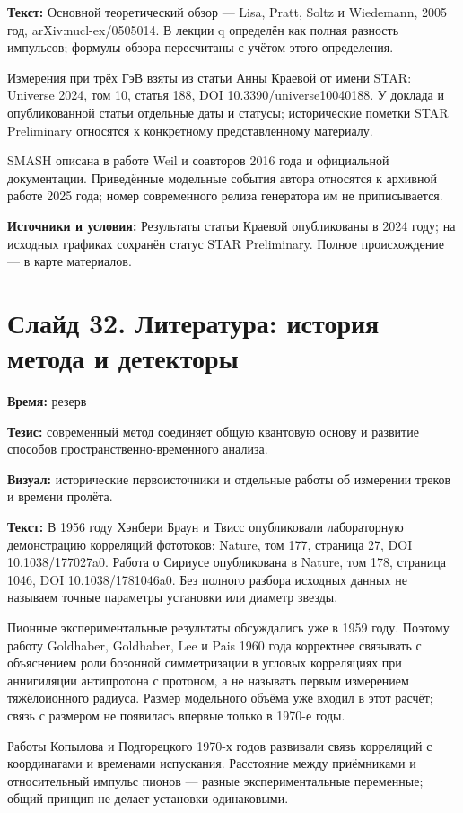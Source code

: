 \documentclass[11pt,a4paper]{article}
\begin{document}
\textbf{Текст:} Основной теоретический обзор — Lisa, Pratt, Soltz и Wiedemann, 2005 год, arXiv:nucl-ex/0505014. В лекции q определён как полная разность импульсов; формулы обзора пересчитаны с учётом этого определения.

Измерения при трёх ГэВ взяты из статьи Анны Краевой от имени STAR: Universe 2024, том 10, статья 188, DOI 10.3390/universe10040188. У доклада и опубликованной статьи отдельные даты и статусы; исторические пометки STAR Preliminary относятся к конкретному представленному материалу.

SMASH описана в работе Weil и соавторов 2016 года и официальной документации. Приведённые модельные события автора относятся к архивной работе 2025 года; номер современного релиза генератора им не приписывается.

\textbf{Источники и условия:} Результаты статьи Краевой опубликованы в 2024 году; на исходных графиках сохранён статус STAR Preliminary. Полное происхождение — в карте материалов.

\clearpage
\section*{Слайд 32. Литература: история метода и детекторы}
\textbf{Время:} резерв

\textbf{Тезис:} современный метод соединяет общую квантовую основу и развитие способов пространственно-временного анализа.

\textbf{Визуал:} исторические первоисточники и отдельные работы об измерении треков и времени пролёта.

\textbf{Текст:} В 1956 году Хэнбери Браун и Твисс опубликовали лабораторную демонстрацию корреляций фототоков: Nature, том 177, страница 27, DOI 10.1038/177027a0. Работа о Сириусе опубликована в Nature, том 178, страница 1046, DOI 10.1038/1781046a0. Без полного разбора исходных данных не называем точные параметры установки или диаметр звезды.

Пионные экспериментальные результаты обсуждались уже в 1959 году. Поэтому работу Goldhaber, Goldhaber, Lee и Pais 1960 года корректнее связывать с объяснением роли бозонной симметризации в угловых корреляциях при аннигиляции антипротона с протоном, а не называть первым измерением тяжёлоионного радиуса. Размер модельного объёма уже входил в этот расчёт; связь с размером не появилась впервые только в 1970-е годы.

Работы Копылова и Подгорецкого 1970-х годов развивали связь корреляций с координатами и временами испускания. Расстояние между приёмниками и относительный импульс пионов — разные экспериментальные переменные; общий принцип не делает установки одинаковыми.
\end{document}
